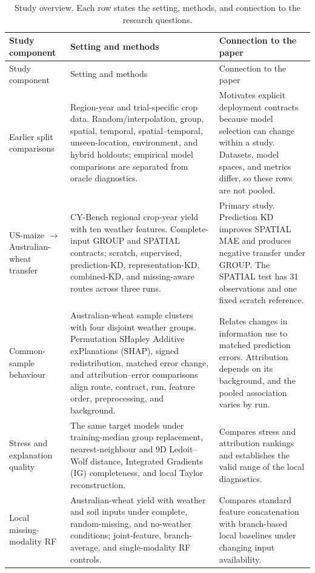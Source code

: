 \documentclass[runningheads]{venue/lncs/llncs}
\begin{document}
\begin{landscape}
\small
\setlength{\tabcolsep}{3pt}
\renewcommand{\arraystretch}{1.12}
\begin{longtable}{p{3.2cm}p{6.4cm}p{7.0cm}}
\caption{Study overview. Each row states the setting, methods, and connection to the research questions.}\label{tab:experiment-map}\\
\toprule
Study component & Setting and methods & Connection to the paper\\
\midrule
\endfirsthead
\toprule
Study component & Setting and methods & Connection to the paper\\
\midrule
\endhead
Earlier split comparisons & Region-year and trial-specific crop data. Random/interpolation, group, spatial, temporal, spatial--temporal, unseen-location, environment, and hybrid holdouts; empirical model comparisons are separated from oracle diagnostics. & Motivates explicit deployment contracts because model selection can change within a study. Datasets, model spaces, and metrics differ, so these rows are not pooled.\\
US-maize $\rightarrow$ Australian-wheat transfer & CY-Bench regional crop-year yield with ten weather features. Complete-input GROUP and SPATIAL contracts; scratch, supervised, prediction-KD, representation-KD, combined-KD, and missing-aware routes across three runs. & Primary study. Prediction KD improves SPATIAL MAE and produces negative transfer under GROUP. The SPATIAL test has 31 observations and one fixed scratch reference.\\
Common-sample behaviour & Australian-wheat sample clusters with four disjoint weather groups. Permutation SHapley Additive exPlanations (SHAP), signed redistribution, matched error change, and attribution--error comparisons align route, contract, run, feature order, preprocessing, and background. & Relates changes in information use to matched prediction errors. Attribution depends on its background, and the pooled association varies by run.\\
Stress and explanation quality & The same target models under training-median group replacement, nearest-neighbour and 9D Ledoit--Wolf distance, Integrated Gradients (IG) completeness, and local Taylor reconstruction. & Compares stress and attribution rankings and establishes the valid range of the local diagnostics.\\
Local missing-modality RF & Australian-wheat yield with weather and soil inputs under complete, random-missing, and no-weather conditions; joint-feature, branch-average, and single-modality RF controls. & Compares standard feature concatenation with branch-based local baselines under changing input availability.\\

\end{longtable}
\end{landscape}
\end{document}
